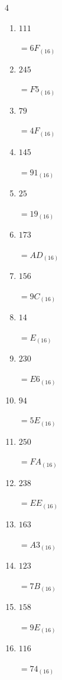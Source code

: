 \begin{multicols}{4}
\begin{enumerate}
  \item $111$

        $=6F_{(16)}$

\columnbreak %

\resetques

  \item $245$

        $=F5_{(16)}$

  \item $79$

        $=4F_{(16)}$

  \item $145$

        $=91_{(16)}$

  \item $25$

        $=19_{(16)}$

  \item $173$

        $=AD_{(16)}$

  \item $156$

        $=9C_{(16)}$

  \item $14$

        $=E_{(16)}$

  \item $230$

        $=E6_{(16)}$

  \item $94$

        $=5E_{(16)}$

  \item $250$

        $=FA_{(16)}$

  \item $238$

        $=EE_{(16)}$

  \item $163$

        $=A3_{(16)}$

  \item $123$

        $=7B_{(16)}$

  \item $158$

        $=9E_{(16)}$

  \item $116$

        $=74_{(16)}$


\end{enumerate}
\end{multicols}
